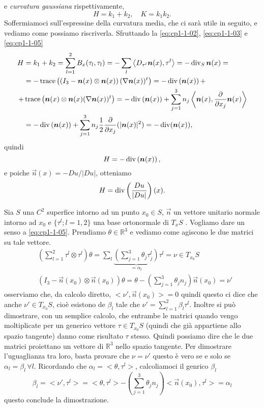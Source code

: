  e \emph{curvatura gaussiana} rispettivamente,
\begin{equation}
\label{eq:cp-1-1-06}
H=k_1+k_2,\quad K=k_1k_2.
\end{equation}
Soffermiamoci sull'espressine della curvatura media, che ci sarà utile in seguito, e vediamo come possiamo riscriverla. Sfruttando la \eqref{eq:cp1-1-02},  \eqref{eq:cp1-1-03} e \eqref{eq:cp1-1-05}
\[
\begin{aligned}
H &= k_1+k_2 = \sum_{l=1}^2B_x(\tau_l,\tau_l)=-\sum_{l}\left<D_{\tau^l}\bm{n}(x),\tau^l\right>=-\operatorname{div}_{S}\bm{n}(x)=\\
&=-\operatorname{trace}\left(\left(I_3 - \bm{n}(x)\otimes\bm{n}(x)\right) (\nabla \bm{n}(x))^t\right)=-\operatorname{div}\left(\bm{n}(x)\right)+\\
+&\operatorname{trace}\left(\bm{n}(x)\otimes\bm{n}(x) (\nabla \bm{n}(x))^t\right)=-\operatorname{div}\left(\bm{n}(x)\right)+ \sum_{j=1}^3n_j\left<\bm{n}(x),\frac{\partial}{\partial x_j}\bm{n}(x)\right>\\
&=-\operatorname{div}\left(\bm{n}(x)\right)+\sum_{j=1}^3n_j\frac{1}{2}\frac{\partial}{\partial x_j}(|\bm{n}(x)|^2)=-\operatorname{div}(\bm{n}(x)),
\end{aligned}
\]
quindi
\begin{equation}
\label{eq:cp1-1-07}
H=-\operatorname{div}\left(\bm{n}(x)\right),
\end{equation}
e poiche  $\vec{n}(x)=-Du/|Du|$, otteniamo
\[
H=\operatorname{div}\left(\frac{Du}{|Du|}\right)(x).
\]
\begin{osservazione}
\label{oss:cp1-1-01}
Sia $S$ una $C^2$ superfice intorno ad un punto $x_0\in S$,  $\vec{n}$ un vettore unitario normale intorno ad $x_0$ e $\{\tau^l;l=1,2\}$ una base ortonormale di $T_xS$ . Vogliamo dare un senso a \eqref{eq:cp1-1-05}. Prendiamo $\theta\in\mathbb{R}^3$ e vediamo come agiscono le due matrici su tale vettore.
\[
\begin{aligned}
&\left(\sum_{l=1}^2\tau^l\otimes\tau^l\right)\theta = \sum_l\underbrace{\left(\sum_{j=1}^3\theta_j\tau_j^l\right)}_{{}=\alpha_l}\tau^l=\nu \in T_{x_0}S\\
&\left(I_3-\vec{n}(x_0)\otimes\vec{n}(x_0)\right)\theta = \theta - \left(\sum_{j=1}^3\theta_jn_j\right)\vec{n}(x_0)=\nu' 
\end{aligned}
\]
osserviamo che, da calcolo diretto, $<\nu',\vec{n}(x_0)>=0$ quindi questo ci dice che anche $\nu'\in T_{x_0}S$, cioè esistono de $\beta_l$ tale che $\nu'=\sum_{l=1}^2\beta_l\tau^l$. Inoltre si può dimostrare, con un semplice calcolo, che entrambe le matrici quando vengo moltiplicate per un generico vettore $\tau\in T_{x_0}S$ (quindi che già appartiene allo spazio tangente) danno come risultato $\tau$ stesso. Quindi possiamo dire che le due matrici proiettano un vettore di $\mathbb{R}^3$ nello spazio tangente. Per dimostrare l'uguaglianza tra loro, basta provare che $\nu=\nu'$ questo è vero se e solo se $\alpha_l=\beta_l\,\forall l$. Ricordando che $\alpha_l=<\theta,\tau^l>$, calcoliamoci il genrico $\beta_l$
\[
\beta_l=<\nu',\tau^l>=<\theta,\tau^l>-\left(\sum_{j=1}^3\theta_jn_j\right)<\vec{n}(x_0),\tau^l>=\alpha_l
\]
questo conclude la dimostrazione.
\end{osservazione}
%
%
